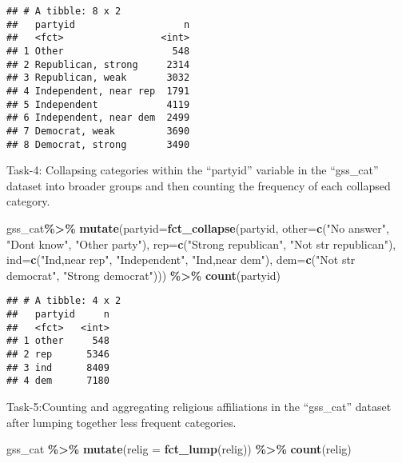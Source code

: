 \documentclass[
]{article}
\newenvironment{Shaded}{\begin{snugshade}}{\end{snugshade}}
\newcommand{\AttributeTok}[1]{\textcolor[rgb]{0.13,0.29,0.53}{#1}}
\newcommand{\FunctionTok}[1]{\textcolor[rgb]{0.13,0.29,0.53}{\textbf{#1}}}
\newcommand{\NormalTok}[1]{#1}
\newcommand{\SpecialCharTok}[1]{\textcolor[rgb]{0.81,0.36,0.00}{\textbf{#1}}}
\newcommand{\StringTok}[1]{\textcolor[rgb]{0.31,0.60,0.02}{#1}}
\begin{document}
\begin{verbatim}
## # A tibble: 8 x 2
##   partyid                   n
##   <fct>                 <int>
## 1 Other                   548
## 2 Republican, strong     2314
## 3 Republican, weak       3032
## 4 Independent, near rep  1791
## 5 Independent            4119
## 6 Independent, near dem  2499
## 7 Democrat, weak         3690
## 8 Democrat, strong       3490
\end{verbatim}

Task-4: Collapsing categories within the ``partyid'' variable in the
``gss\_cat'' dataset into broader groups and then counting the frequency
of each collapsed category.

\begin{Shaded}
\begin{Highlighting}[]
\NormalTok{gss\_cat}\SpecialCharTok{\%\textgreater{}\%}
  \FunctionTok{mutate}\NormalTok{(}\AttributeTok{partyid=}\FunctionTok{fct\_collapse}\NormalTok{(partyid,}
                              \AttributeTok{other=}\FunctionTok{c}\NormalTok{(}\StringTok{"No answer"}\NormalTok{, }\StringTok{"Don\textquotesingle{}t know"}\NormalTok{, }\StringTok{"Other party"}\NormalTok{),}
                              \AttributeTok{rep=}\FunctionTok{c}\NormalTok{(}\StringTok{"Strong republican"}\NormalTok{, }\StringTok{"Not str republican"}\NormalTok{),}
                              \AttributeTok{ind=}\FunctionTok{c}\NormalTok{(}\StringTok{"Ind,near rep"}\NormalTok{, }\StringTok{"Independent"}\NormalTok{, }\StringTok{"Ind,near dem"}\NormalTok{),}
                              \AttributeTok{dem=}\FunctionTok{c}\NormalTok{(}\StringTok{"Not str democrat"}\NormalTok{, }\StringTok{"Strong democrat"}\NormalTok{))) }\SpecialCharTok{\%\textgreater{}\%}
  \FunctionTok{count}\NormalTok{(partyid)}
\end{Highlighting}
\end{Shaded}

\begin{verbatim}
## # A tibble: 4 x 2
##   partyid     n
##   <fct>   <int>
## 1 other     548
## 2 rep      5346
## 3 ind      8409
## 4 dem      7180
\end{verbatim}

Task-5:Counting and aggregating religious affiliations in the
``gss\_cat'' dataset after lumping together less frequent categories.

\begin{Shaded}
\begin{Highlighting}[]
\NormalTok{gss\_cat }\SpecialCharTok{\%\textgreater{}\%}
  \FunctionTok{mutate}\NormalTok{(}\AttributeTok{relig =} \FunctionTok{fct\_lump}\NormalTok{(relig)) }\SpecialCharTok{\%\textgreater{}\%}
  \FunctionTok{count}\NormalTok{(relig)}
\end{Highlighting}
\end{Shaded}
\end{document}
